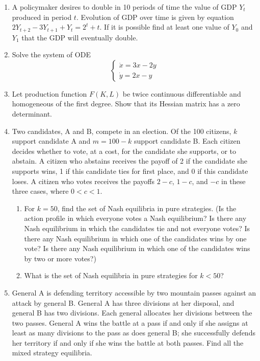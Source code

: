\documentclass[12pt]{article} %
\theoremstyle{definition} %
\begin{document}
\begin{enumerate}

\item A policymaker desires to double in 10 periods of time the value of GDP $Y_t$ produced in period $t$. Evolution of GDP over time is given by equation $2Y_{t+2}-3Y_{t+1}+Y_t=2^t+t$. If it is possible find at least one value of  $Y_0$ and $Y_1$ that the GDP will eventually double.


\item  Solve the system of ODE
\[
\begin{cases}
\dot{x}=3x-2y \\
\dot{y}=2x-y
\end{cases}
\]




\item  Let production function $F(K, L)$ be twice continuous differentiable and homogeneous of the first degree. Show that its Hessian matrix has a zero determinant.

\item  Two candidates, A and B, compete in an election. Of the 100 citizens, $k$ support candidate A and $m= 100 - k$ support candidate B. Each citizen decides whether to vote, at a cost, for the candidate she supports, or to abstain. A citizen who abstains receives the payoff of 2 if the candidate she supports wins, 1 if this candidate ties for first place, and 0 if this candidate loses. A citizen who votes receives the payoffs $2 - c$, $1 - c$, and $-c$ in these three cases, where $0 < c < 1$.
\begin{enumerate}
\item  For $k = 50$, find the set of Nash equilibria in pure strategies. (Is the action profile in which everyone votes a Nash equilibrium? Is there any Nash equilibrium in which the candidates tie and not everyone votes? Is there any Nash equilibrium in which one of the candidates wins by one vote? Is there any Nash equilibrium in which one of the candidates wins by two or more votes?)
\item  What is the set of Nash equilibria in pure strategies for $k < 50$?
\end{enumerate}

\item General A is defending territory accessible by two mountain passes against an attack by general B. General A has three divisions at her disposal, and general B has two divisions. Each general allocates her divisions between the two passes. General A wins the battle at a pass if and only if she assigns at least as many divisions to the pass as does general B; she successfully defends her territory if and only if she wins the battle at both passes. Find all the mixed strategy equilibria.


\end{enumerate}
\end{document}
